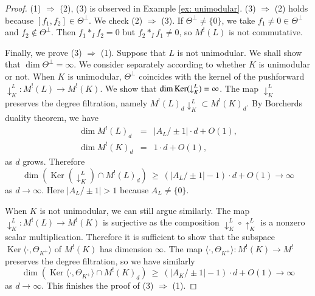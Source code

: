 \documentclass[12pt]{amsart}
\numberwithin{equation}{section}
\theoremstyle{definition}
\theoremstyle{remark}
\renewcommand{\ker}{\operatorname{Ker}}
\newcommand{\pushLK}{\downarrow^{L}_{K}}
\newcommand{\ThetaK}{\Theta_{K^{+}}}
\newcommand{\ML}{M^{!}(L)}
\begin{document}
\begin{proof}
(1) $\Rightarrow$ (2), (3) is observed in Example \ref{ex: unimodular}. 
(3) $\Rightarrow$ (2) holds because $[f_1, f_2]\in \Theta^{\perp}$. 
We check (2) $\Rightarrow$ (3). 
If $\Theta^{\perp}\ne \{ 0 \}$, 
we take $f_1\ne 0 \in \Theta^{\perp}$ and $f_2\not\in \Theta^{\perp}$. 
Then $f_1\ast_{I}f_2=0$ but $f_{2}\ast_{I}f_{1}\ne 0$, 
so ${\ML}$ is not commutative. 

Finally, we prove (3) $\Rightarrow$ (1). 
Suppose that $L$ is not unimodular. 
We shall show that $\dim \Theta^{\perp} = \infty$. 
We consider separately according to whether $K$ is unimodular or not. 
When $K$ is unimodular, 
$\Theta^{\perp}$ coincides with the kernel of the pushforward 
${\pushLK}\colon {\ML} \to M^{!}(K)$. 
We show that 
$\dim {\rm Ker}({\pushLK})= \infty$. 
The map ${\pushLK}$ preserves the degree filtration, 
namely 
$M^!(L)_{d}{\pushLK} \subset M^!(K)_d$. 
By Borcherds duality theorem, we have 
\begin{eqnarray*}
\dim M^!(L)_d & = & |A_L/\pm 1| \cdot d+O(1), \\
\dim M^!(K)_d & = & 1\cdot d+O(1), 
\end{eqnarray*}
as $d$ grows. 
Therefore 
\begin{equation*}
\dim (\ker({\pushLK})\cap M^!(L)_d) \: \geq \: (|A_L/\pm1|-1)\cdot d + O(1) \to \infty 
\end{equation*}
as $d\to \infty$. 
Here $|A_L/\pm1|>1$ because $A_{L}\ne \{ 0 \}$. 

When $K$ is not unimodular, we can still argue similarly. 
The map 
${\pushLK}\colon {\ML}\to M^!(K)$ 
is surjective as 
the composition $\downarrow^{L}_{K} \circ \uparrow^{L}_{K}$ is a nonzero scalar multiplication.  
Therefore it is sufficient to show that the subspace 
$\ker \langle \cdot, {\ThetaK} \rangle$ of $M^!(K)$ 
has dimension $\infty$. 
The map 
$\langle \cdot, {\ThetaK} \rangle \colon M^!(K)\to M^!$ 
preserves the degree filtration, 
so we have similarly 
\begin{equation*}
\dim (\ker \langle \cdot, {\ThetaK} \rangle \cap M^!(K)_d) \: \geq \: (|A_K/\pm 1|-1)\cdot d + O(1) \to \infty 
\end{equation*}
as $d\to \infty$. 
This finishes the proof of (3) $\Rightarrow$ (1). 
\end{proof}
\end{document}
